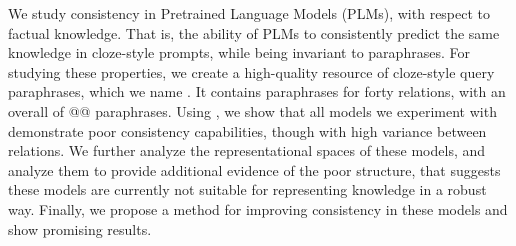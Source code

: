 We study consistency in Pretrained Language Models (PLMs), with respect to factual knowledge. That is, the ability of PLMs to consistently predict the same knowledge in cloze-style prompts, while being invariant to paraphrases.
For studying these properties, we create a high-quality resource of cloze-style query paraphrases, which we name \resource{}. It contains paraphrases for forty relations, with an overall of @@ paraphrases.
Using \resource{}, we show that all models we experiment with demonstrate poor consistency capabilities, though with high variance between relations.
We further analyze the representational spaces of these models, and analyze them to provide additional evidence of the poor structure, that suggests these models are currently not suitable for representing knowledge in a robust way.
Finally, we propose a method for improving consistency in these models and show promising results.
